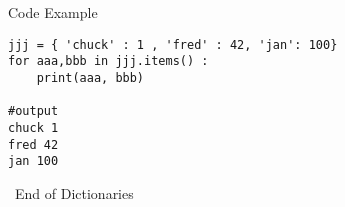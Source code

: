 \documentclass[serif, aspectratio=169]{beamer}
\begin{document}
\begin{frame}[fragile]{Code Example}
    \begin{lstlisting}
jjj = { 'chuck' : 1 , 'fred' : 42, 'jan': 100}
for aaa,bbb in jjj.items() :
    print(aaa, bbb)
    
#output
chuck 1
fred 42
jan 100

    \end{lstlisting}
\end{frame}


\begin{frame}
    \begin{center}
        {\Huge\ End of Dictionaries}
    \end{center}
\end{frame}
\end{document}

